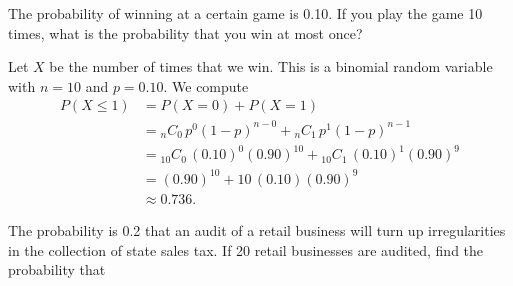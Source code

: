 \documentclass[answers,11pt]{exam}
\renewcommand{\binom}[2]{\ensuremath{{}_{#1}C_{#2}}\,}
\begin{document}
\begin{questions}

\newpage

\question \label{ques:binom-game} The probability of winning at a certain game
is 0.10.  If you play the game 10 times, what is the probability that you win
at most once?


\begin{solution}
Let $X$ be the number of times that we win.  This is a binomial random
variable with $n = 10$ and $p = 0.10$.  We compute
\begin{align*}
  P(X \leq 1)
    &= P(X = 0) + P(X = 1) \\
    &= \binom{n}{0} p^0 (1-p)^{n-0} + \binom{n}{1} p^1 (1 - p)^{n-1} \\
    &= \binom{10}{0} (0.10)^0 (0.90)^{10} + \binom{10}{1} (0.10)^1 (0.90)^9 \\
    &= (0.90)^{10} + 10 \, (0.10) (0.90)^9 \\
    &\approx 0.736.
\end{align*}

\end{solution}


\question The probability is 0.2 that an audit of a retail business will turn up
irregularities in the collection of state sales tax.  If 20 retail businesses
are audited, find the probability that

\begin{parts}




\end{parts}
\end{questions}
\end{document}
